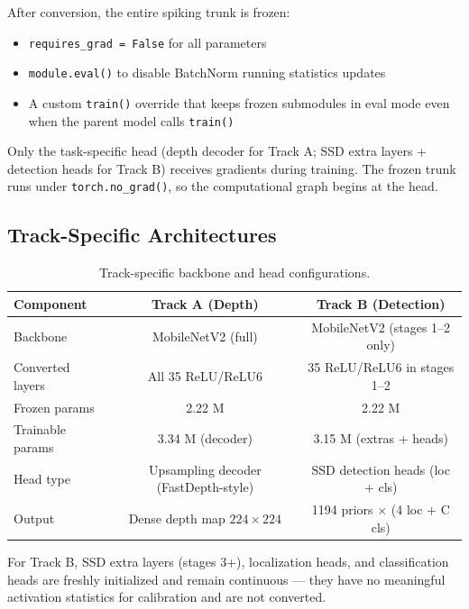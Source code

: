 \documentclass[10pt,conference]{IEEEtran}
\begin{document}
After conversion, the entire spiking trunk is frozen:

\begin{itemize}
    \item \texttt{requires\_grad = False} for all parameters
    \item \texttt{module.eval()} to disable BatchNorm running statistics updates
    \item A custom \texttt{train()} override that keeps frozen submodules in eval mode even when the parent model calls \texttt{train()}
\end{itemize}

Only the task-specific head (depth decoder for Track A; SSD extra layers + detection heads for Track B) receives gradients during training. The frozen trunk runs under \texttt{torch.no\_grad()}, so the computational graph begins at the head.

\subsection{Track-Specific Architectures}

\begin{table}[t]
\caption{Track-specific backbone and head configurations.}
\label{tab:arch}
\centering
\begin{tabular}{lcc}
\toprule
Component & Track A (Depth) & Track B (Detection) \\
\midrule
Backbone & MobileNetV2 (full) & MobileNetV2 (stages 1--2 only) \\
Converted layers & All 35 ReLU/ReLU6 & 35 ReLU/ReLU6 in stages 1--2 \\
Frozen params & 2.22 M & 2.22 M \\
Trainable params & 3.34 M (decoder) & 3.15 M (extras + heads) \\
Head type & Upsampling decoder (FastDepth-style) & SSD detection heads (loc + cls) \\
Output & Dense depth map $224 \times 224$ & 1194 priors $\times$ (4 loc + C cls) \\
\bottomrule
\end{tabular}
\end{table}

For Track B, SSD extra layers (stages 3+), localization heads, and classification heads are freshly initialized and remain continuous — they have no meaningful activation statistics for calibration and are not converted.

\end{document}
